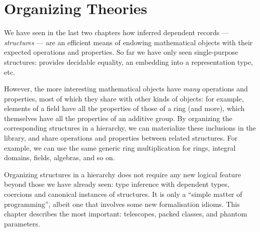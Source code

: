 \chapter{Organizing Theories}{}
\label{ch:hierarchy}






We have seen in the last two chapters how inferred dependent records
--- \emph{structures} --- are an efficient means of endowing
mathematical objects with their expected operations and properties.
So far we have only seen single-purpose structures: 
provides decidable equality,  an embedding into a
representation type, etc.

However, the more interesting mathematical objects have \emph{many}
operations and properties, most of which they share with other kinds
of objects: for example, elements of a field have all the properties
of those of a ring (and more), which themselves have all the
properties of an additive group. By organizing the corresponding
\mcbCIC{} structures in a hierarchy, we can materialize these
inclusions in the \mcbMC{} library, and share operations and properties
between related structures. For example, we can use the same generic
ring multiplication for rings, integral domains, fields, algebras, and
so on.

Organizing structures in a hierarchy does not require any new logical
feature beyond those we have already seen: type inference with
dependent types, coercions and canonical instances of structures.  It
is only a ``simple matter of programming'', albeit one that involves
some new formalisation idioms. This chapter describes the most
important: telescopes, packed classes, and phantom parameters.

